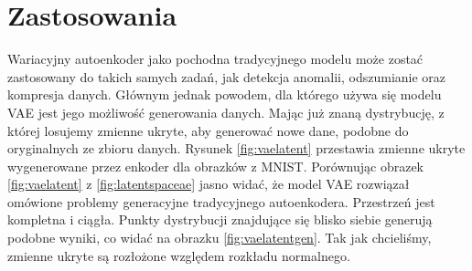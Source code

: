 \documentclass[a4paper,12pt,oneside]{book} %
\begin{document}
\section{Zastosowania}
Wariacyjny autoenkoder jako pochodna tradycyjnego modelu może zostać zastosowany do takich samych zadań, jak detekcja anomalii, odszumianie oraz kompresja danych. Głównym jednak powodem, dla którego używa się modelu VAE jest jego możliwość generowania danych. Mając już znaną dystrybucję, z której losujemy zmienne ukryte, aby generować nowe dane, podobne do oryginalnych ze zbioru danych. Rysunek \ref{fig:vaelatent} przestawia zmienne ukryte wygenerowane przez enkoder dla obrazków z MNIST. Porównując obrazek \ref{fig:vaelatent} z \ref{fig:latentspaceae} jasno widać, że model VAE rozwiązał omówione problemy generacyjne tradycyjnego autoenkodera. Przestrzeń jest kompletna i ciągła. Punkty dystrybucji znajdujące się blisko siebie generują podobne wyniki, co widać na obrazku \ref{fig:vaelatentgen}. Tak jak chcieliśmy, zmienne ukryte są rozłożone względem rozkładu normalnego. 
\end{document}
